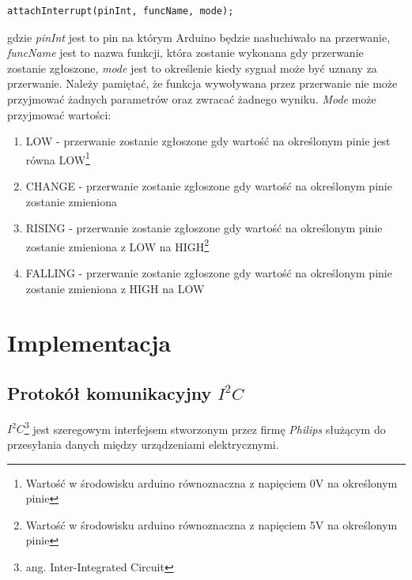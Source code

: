\documentclass{xmgr}
\begin{document}
\begin{lstlisting}[label=bot-dirs-alg,caption=Obsługa przerwań sprzętowych w środowisku Arduino]
attachInterrupt(pinInt, funcName, mode);
\end{lstlisting}
gdzie \emph{pinInt} jest to pin na którym Arduino będzie nasłuchiwało na przerwanie, \emph{funcName} jest to nazwa funkcji, która zostanie wykonana gdy przerwanie zostanie zgłoszone, \emph{mode} jest to określenie kiedy sygnał może być uznany za przerwanie. Należy pamiętać, że funkcja wywoływana przez przerwanie nie może przyjmować żadnych parametrów oraz zwracać żadnego wyniku. \emph{Mode} może przyjmować wartości: 
\begin{enumerate}
	\item LOW - przerwanie zostanie zgłoszone gdy wartość na określonym pinie jest równa LOW\footnote{Wartość w środowisku arduino równoznaczna z napięciem 0V na określonym pinie}
	\item CHANGE - przerwanie zostanie zgłoszone gdy wartość na określonym pinie zostanie zmieniona
	\item RISING - przerwanie zostanie zgłoszone gdy wartość na określonym pinie zostanie zmieniona z LOW na HIGH\footnote{Wartość w środowisku arduino równoznaczna z napięciem 5V na określonym pinie}
	\item FALLING - przerwanie zostanie zgłoszone gdy wartość na określonym pinie zostanie zmieniona z HIGH na LOW
\end{enumerate}


\chapter{Implementacja}
\section{Protokół komunikacyjny $I^2C$}
\emph{$I^2C$}\footnote{ang. Inter-Integrated Circuit} jest szeregowym interfejsem stworzonym przez firmę \emph{Philips} służącym do przesyłania danych między urządzeniami elektrycznymi. 
\end{document}

